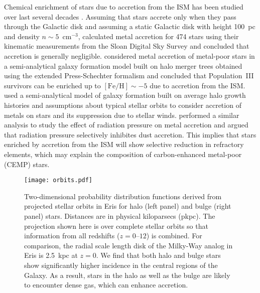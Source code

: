 \documentclass[a4paper,fleqn,usenatbib]{mnras}
\begin{document}
Chemical enrichment of stars due to accretion from the ISM has been
studied over last several decades \citep{1977ApJS...34..295T,
  1980ApJ...235..541A, 1981A&A....97..280Y, 1983MmSAI..54..321I,
  2009MNRAS.392L..50F, 2009ApJ...696L..79K, 2010ApJ...717..542K,
  2011MNRAS.413.1184J, 2015ApJ...808L..47K, 2015MNRAS.453.2771J}.
Assuming that stars accrete only when they pass through the Galactic
disk and assuming a static Galactic disk with height 100~pc and
density $n\sim 5$~cm$^{-3}$, \citet{2009MNRAS.392L..50F} calculated
metal accretion for 474 stars using their kinematic measurements from
the Sloan Digital Sky Survey and concluded that accretion is generally
negligible.  \citet{2009ApJ...696L..79K, 2010ApJ...717..542K,
  2015ApJ...808L..47K} considered metal accretion of metal-poor stars
in a semi-analytical galaxy formation model built on halo merger trees
obtained using the extended Press-Schechter formalism and concluded
that Population~III survivors can be enriched up to
$[\mathrm{Fe}/\mathrm{H}]\sim -5$ due to accretion from the ISM.
\citet{2011MNRAS.413.1184J} used a semi-analytical model of galaxy
formation built on average halo growth histories
\citep{2010MNRAS.406..896B} and assumptions about typical stellar
orbits to consider accretion of metals on stars and its suppression
due to stellar winds.  \citet{2015MNRAS.453.2771J} performed a similar
analysis to study the effect of radiation pressure on metal accretion
and argued that radiation pressure selectively inhibites dust
accretion.  This implies that stars enriched by accretion from the ISM
will show selective reduction in refractory elements, which may
explain the composition of carbon-enhanced metal-poor (CEMP) stars.

\begin{figure*}
  \begin{center}
    \texttt{[image: orbits.pdf]}
  \end{center}
  \caption{Two-dimensional probability distribution functions derived
    from projected stellar orbits in Eris for halo (left panel) and
    bulge (right panel) stars.  Distances are in physical kiloparsecs
    (pkpc).  The projection shown here is over complete stellar orbits
    so that information from all redshifts ($z=0$--$12$) is combined.
    For comparison, the radial scale length disk of the Milky-Way
    analog in Eris is 2.5~kpc at $z=0$.  We find that both halo and
    bulge stars show significantly higher incidence in the central
    regions of the Galaxy.  As a result, stars in the halo as well as
    the bulge are likely to encounter dense gas, which can enhance
    accretion.  }
  \label{fig:orbits}
\end{figure*}
\end{document}
